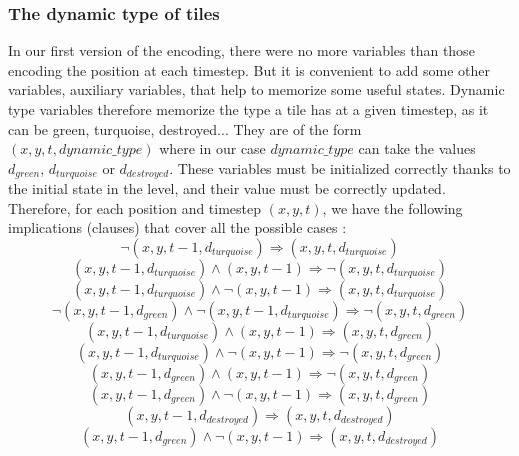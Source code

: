 \documentclass[a4paper, 12pt, titlepage]{article}
\begin{document}
\subsubsection{The dynamic type of tiles}
In our first version of the encoding, there were no more variables than those
encoding the position at each timestep. But it is convenient to add some other
variables, auxiliary variables, that help to memorize some useful states.
Dynamic type variables therefore memorize the type a tile has at a given
timestep, as it can be green, turquoise, destroyed... They are of the form
$(x, y, t, dynamic\_type)$ where in our case $dynamic\_type$ can take the values
$d_{green}$, $d_{turquoise}$ or $d_{destroyed}$. These variables must be
initialized correctly thanks to the initial state in the level, and their value
must be correctly updated. Therefore, for each position and timestep
$(x, y, t)$, we have the following implications (clauses) that cover all the
possible cases :
\begin{equation}
\neg(x, y, t-1, d_{turquoise}) \Rightarrow (x, y, t, d_{turquoise})
\end{equation}
\begin{equation}
(x, y, t-1, d_{turquoise}) \wedge (x, y, t-1) \Rightarrow
					      \neg(x, y, t, d_{turquoise})
\end{equation}
\begin{equation}
(x, y, t-1, d_{turquoise}) \wedge \neg(x, y, t-1) \Rightarrow
						  (x, y, t, d_{turquoise})
\end{equation}
\begin{equation}
\neg(x, y, t-1, d_{green}) \wedge \neg(x, y, t-1, d_{turquoise}) \Rightarrow
							\neg(x, y, t, d_{green})
\end{equation}
\begin{equation}
(x, y, t-1, d_{turquoise}) \wedge (x, y, t-1) \Rightarrow (x, y, t, d_{green})
\end{equation}
\begin{equation}
(x, y, t-1, d_{turquoise}) \wedge \neg(x, y, t-1) \Rightarrow
						  \neg(x, y, t, d_{green})
\end{equation}
\begin{equation}
(x, y, t-1, d_{green}) \wedge (x, y, t-1) \Rightarrow \neg(x, y, t, d_{green})
\end{equation}
\begin{equation}
(x, y, t-1, d_{green}) \wedge \neg(x, y, t-1) \Rightarrow (x, y, t, d_{green})
\end{equation}
\begin{equation}
(x, y, t-1, d_{destroyed}) \Rightarrow (x, y, t, d_{destroyed})
\end{equation}
\begin{equation}
(x, y, t-1, d_{green}) \wedge \neg(x, y, t-1) \Rightarrow
					      (x, y, t, d_{destroyed})
\end{equation}
\end{document}
